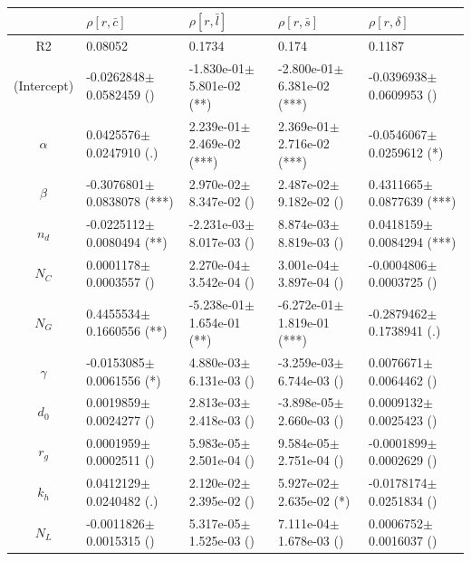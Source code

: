 \begin{center}

\begin{tabular}{|c|p{3.7cm}|p{3.7cm}|p{3.7cm}|p{3.7cm}|}
 \hline
&$\rho[r,\bar{c}]$&$\rho[r,\bar{l}]$&$\rho[r,\bar{s}]$&$\rho[r,\delta]$\\\hline
R2&0.08052&0.1734&0.174&0.1187\\\hline
(Intercept)&-0.0262848$\pm$0.0582459 ()&-1.830e-01$\pm$5.801e-02 (**)&-2.800e-01$\pm$6.381e-02 (***)&-0.0396938$\pm$0.0609953 ()\\
$\alpha$&0.0425576$\pm$0.0247910 (.)&2.239e-01$\pm$2.469e-02 (***)&2.369e-01$\pm$2.716e-02 (***)&-0.0546067$\pm$0.0259612 (*)\\
$\beta$&-0.3076801$\pm$0.0838078 (***)&2.970e-02$\pm$8.347e-02 ()&2.487e-02$\pm$9.182e-02 ()&0.4311665$\pm$0.0877639 (***)\\
$n_d$&-0.0225112$\pm$0.0080494 (**)&-2.231e-03$\pm$8.017e-03 ()&8.874e-03$\pm$8.819e-03 ()&0.0418159$\pm$0.0084294 (***)\\
$N_C$&0.0001178$\pm$0.0003557 ()&2.270e-04$\pm$3.542e-04 ()&3.001e-04$\pm$3.897e-04 ()&-0.0004806$\pm$0.0003725 ()\\
$N_G$&0.4455534$\pm$0.1660556 (**)&-5.238e-01$\pm$1.654e-01 (**)&-6.272e-01$\pm$1.819e-01 (***)&-0.2879462$\pm$0.1738941 (.)\\
$\gamma$&-0.0153085$\pm$0.0061556 (*)&4.880e-03$\pm$6.131e-03 ()&-3.259e-03$\pm$6.744e-03 ()&0.0076671$\pm$0.0064462 ()\\
$d_0$&0.0019859$\pm$0.0024277 ()&2.813e-03$\pm$2.418e-03 ()&-3.898e-05$\pm$2.660e-03 ()&0.0009132$\pm$0.0025423 ()\\
$r_g$&0.0001959$\pm$0.0002511 ()&5.983e-05$\pm$2.501e-04 ()&9.584e-05$\pm$2.751e-04 ()&-0.0001899$\pm$0.0002629 ()\\
$k_h$&0.0412129$\pm$0.0240482 (.)&2.120e-02$\pm$2.395e-02 ()&5.927e-02$\pm$2.635e-02 (*)&-0.0178174$\pm$0.0251834 ()\\
$N_L$&-0.0011826$\pm$0.0015315 ()&5.317e-05$\pm$1.525e-03 ()&7.111e-04$\pm$1.678e-03 ()&0.0006752$\pm$0.0016037 ()\\
\hline
\end{tabular}

\bigskip


\end{center}
